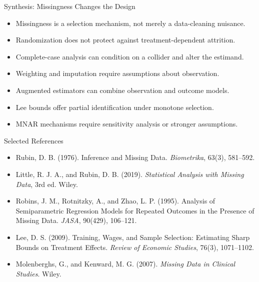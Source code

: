 \documentclass[aspectratio=169,11pt]{beamer}
\begin{document}
\begin{frame}{Synthesis: Missingness Changes the Design}
\begin{itemize}
\item Missingness is a selection mechanism, not merely a data-cleaning nuisance.
\item Randomization does not protect against treatment-dependent attrition.
\item Complete-case analysis can condition on a collider and alter the estimand.
\item Weighting and imputation require assumptions about observation.
\item Augmented estimators can combine observation and outcome models.
\item Lee bounds offer partial identification under monotone selection.
\item MNAR mechanisms require sensitivity analysis or stronger assumptions.
\end{itemize}
\end{frame}

\begin{frame}{Selected References}
\small
\begin{itemize}
\item Rubin, D. B. (1976). Inference and Missing Data. \textit{Biometrika}, 63(3), 581--592.
\item Little, R. J. A., and Rubin, D. B. (2019). \textit{Statistical Analysis with Missing Data}, 3rd ed. Wiley.
\item Robins, J. M., Rotnitzky, A., and Zhao, L. P. (1995). Analysis of Semiparametric Regression Models for Repeated Outcomes in the Presence of Missing Data. \textit{JASA}, 90(429), 106--121.
\item Lee, D. S. (2009). Training, Wages, and Sample Selection: Estimating Sharp Bounds on Treatment Effects. \textit{Review of Economic Studies}, 76(3), 1071--1102.
\item Molenberghs, G., and Kenward, M. G. (2007). \textit{Missing Data in Clinical Studies}. Wiley.
\end{itemize}
\end{frame}

\contactslide
\end{document}
